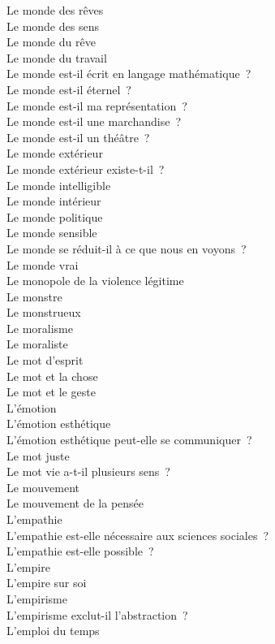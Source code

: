 \documentclass[a4paper,12pt]{article}
\begin{document}
Le monde des rêves \\
Le monde des sens \\
Le monde du rêve \\
Le monde du travail \\
Le monde est-il écrit en langage mathématique ? \\
Le monde est-il éternel ? \\
Le monde est-il ma représentation ? \\
Le monde est-il une marchandise ? \\
Le monde est-il un théâtre ? \\
Le monde extérieur \\
Le monde extérieur existe-t-il ? \\
Le monde intelligible \\
Le monde intérieur \\
Le monde politique \\
Le monde sensible \\
Le monde se réduit-il à ce que nous en voyons ? \\
Le monde vrai \\
Le monopole de la violence légitime \\
Le monstre \\
Le monstrueux \\
Le moralisme \\
Le moraliste \\
Le mot d'esprit \\
Le mot et la chose \\
Le mot et le geste \\
L'émotion \\
L'émotion esthétique \\
L'émotion esthétique peut-elle se communiquer ? \\
Le mot juste \\
Le mot vie a-t-il plusieurs sens ? \\
Le mouvement \\
Le mouvement de la pensée \\
L'empathie \\
L'empathie est-elle nécessaire aux sciences sociales ? \\
L'empathie est-elle possible ? \\
L'empire \\
L'empire sur soi \\
L'empirisme \\
L'empirisme exclut-il l'abstraction ? \\
L'emploi du temps \\
\end{document}
